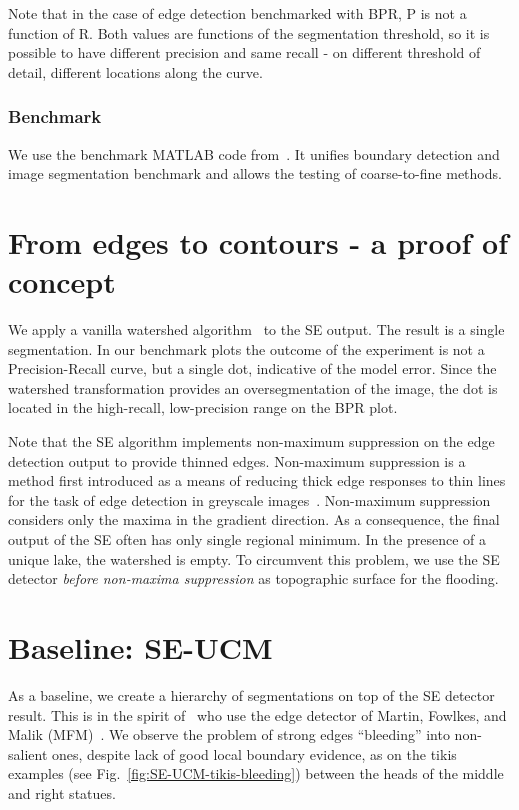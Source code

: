 Note that in the case of edge detection benchmarked with BPR, P is not a function of R. Both values are functions of the segmentation threshold, so it is possible to have different precision and same recall - on different threshold of detail, \ie different locations along the curve.

\subsubsection*{Benchmark}
We use the benchmark MATLAB code from~\cite{Galasso13Benchmark}. %
It unifies boundary detection and image segmentation benchmark and allows the testing of coarse-to-fine methods. %

\section{From edges to contours - a proof of concept}
We apply a vanilla watershed algorithm~\cite{beucher1992morphological,najman1996geodesic,PINKlibrary} to the SE output. The result is a single segmentation. 
In our benchmark plots the outcome of the experiment is not a Precision-Recall curve, but a single dot, indicative of the model error. Since the watershed transformation provides an oversegmentation of the image, the dot is located in the high-recall, low-precision range on the BPR plot.
 
Note that the SE algorithm implements non-maximum suppression on the edge detection output to provide thinned edges. Non-maximum suppression is a method first introduced as a means of reducing thick edge responses to thin lines for the task of edge detection in greyscale images~\cite{rosenfeld1976digital}. Non-maximum suppression considers only the maxima in the gradient direction. As a consequence, the final output of the SE often has only single regional minimum. In the presence of a unique lake, the watershed is empty. To circumvent this problem, we use the SE detector \textit{before non-maxima suppression} as topographic surface for the flooding.

\section{Baseline: SE-UCM}
As a baseline, we create a hierarchy of segmentations on top of the SE detector result. This is in the spirit of~\cite{arbelaez2006boundary} who use the edge detector of Martin, Fowlkes, and Malik (MFM)~\cite{martin2004learning}.
We observe the problem of strong edges ``bleeding'' into non-salient ones, despite lack of good local boundary evidence, as on the tikis examples (see Fig.~\ref{fig:SE-UCM-tikis-bleeding}) between the heads of the middle and right statues.

